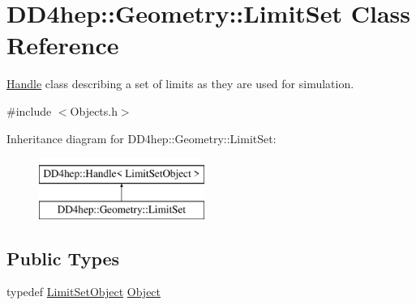 \hypertarget{class_d_d4hep_1_1_geometry_1_1_limit_set}{}\section{D\+D4hep\+:\+:Geometry\+:\+:Limit\+Set Class Reference}
\label{class_d_d4hep_1_1_geometry_1_1_limit_set}


\hyperlink{class_d_d4hep_1_1_handle}{Handle} class describing a set of limits as they are used for simulation.  




{\ttfamily \#include $<$Objects.\+h$>$}

Inheritance diagram for D\+D4hep\+:\+:Geometry\+:\+:Limit\+Set\+:\begin{figure}[H]
\begin{center}
\leavevmode
\includegraphics[height=2.000000cm]{class_d_d4hep_1_1_geometry_1_1_limit_set}
\end{center}
\end{figure}
\subsection*{Public Types}
\begin{DoxyCompactItemize}
\item 
typedef \hyperlink{class_d_d4hep_1_1_geometry_1_1_limit_set_object}{Limit\+Set\+Object} \hyperlink{class_d_d4hep_1_1_geometry_1_1_limit_set_a7fc622c60ba15cb5149d6d2ea21ed42e}{Object}
\end{DoxyCompactItemize}
